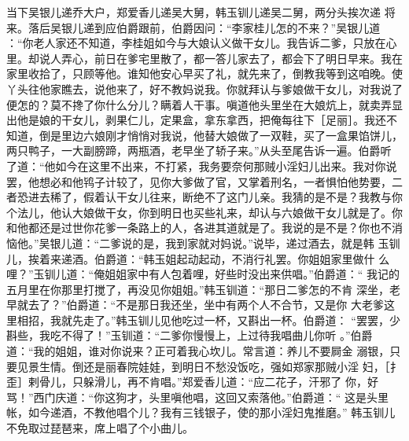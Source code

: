 当下吴银儿递乔大户，郑爱香儿递吴大舅，韩玉钏儿递吴二舅，两分头挨次递
将来。落后吴银儿递到应伯爵跟前，伯爵因问：“李家桂儿怎的不来？”吴银儿道
：“你老人家还不知道，李桂姐如今与大娘认义做干女儿。我告诉二爹，只放在心
里。却说人弄心，前日在爹宅里散了，都一答儿家去了，都会下了明日早来。我在
家里收拾了，只顾等他。谁知他安心早买了礼，就先来了，倒教我等到这咱晚。使
丫头往他家瞧去，说他来了，好不教妈说我。你就拜认与爹娘做干女儿，对我说了
便怎的？莫不搀了你什么分儿？瞒着人干事。嗔道他头里坐在大娘炕上，就卖弄显
出他是娘的干女儿，剥果仁儿，定果盒，拿东拿西，把俺每往下［足丽］。我还不
知道，倒是里边六娘刚才悄悄对我说，他替大娘做了一双鞋，买了一盒果馅饼儿，
两只鸭子，一大副膀蹄，两瓶酒，老早坐了轿子来。”从头至尾告诉一遍。伯爵听
了道：“他如今在这里不出来，不打紧，我务要奈何那贼小淫妇儿出来。我对你说
罢，他想必和他鸨子计较了，见你大爹做了官，又掌着刑名，一者惧怕他势要，二
者恐进去稀了，假着认干女儿往来，断绝不了这门儿亲。我猜的是不是？我教与你
个法儿，他认大娘做干女，你到明日也买些礼来，却认与六娘做干女儿就是了。你
和他都还是过世你花爹一条路上的人，各进其道就是了。我说的是不是？你也不消
恼他。”吴银儿道：“二爹说的是，我到家就对妈说。”说毕，递过酒去，就是韩
玉钏儿，挨着来递酒。伯爵道：“韩玉姐起动起动，不消行礼罢。你姐姐家里做什
么哩？”玉钏儿道：“俺姐姐家中有人包着哩，好些时没出来供唱。”伯爵道：“
我记的五月里在你那里打搅了，再没见你姐姐。”韩玉钏道：“那日二爹怎的不肯
深坐，老早就去了？”伯爵道：“不是那日我还坐，坐中有两个人不合节，又是你
大老爹这里相招，我就先走了。”韩玉钏儿见他吃过一杯，又斟出一杯。伯爵道：
“罢罢，少斟些，我吃不得了！”玉钏道：“二爹你慢慢上，上过待我唱曲儿你听
。”伯爵道：“我的姐姐，谁对你说来？正可着我心坎儿。常言道：养儿不要屙金
溺银，只要见景生情。倒还是丽春院娃娃，到明日不愁没饭吃，强如郑家那贼小淫
妇，［扌歪］剌骨儿，只躲滑儿，再不肯唱。”郑爱香儿道：“应二花子，汗邪了
你，好骂！”西门庆道：“你这狗才，头里嗔他唱，这回又索落他。”伯爵道：“
这是头里帐，如今递酒，不教他唱个儿？我有三钱银子，使的那小淫妇鬼推磨。”
韩玉钏儿不免取过琵琶来，席上唱了个小曲儿。

